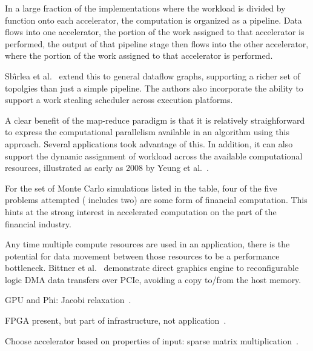 In a large fraction of the implementations where the workload is
divided by function onto each accelerator, the computation is 
organized as a pipeline.  Data flows into one accelerator, the portion
of the work assigned to that accelerator is performed, the output
of that pipeline stage then flows into the other accelerator, where
the portion of the work assigned to that accelerator is performed.

Sb\^{\i}rlea et al.~\cite{szb+12} extend this to general dataflow graphs,
supporting a richer set of topolgies than just a simple pipeline.  The authors
also incorporate the ability to support a work stealing scheduler across
execution platforms.

A clear benefit of the map-reduce paradigm is that it is relatively
straighforward to express the computational parallelism available in
an algorithm using this approach.  Several applications took advantage
of this.  In addition, it can also support the dynamic assignment of
workload across the available computational resources, illustrated as
early as 2008 by Yeung et al.~\cite{ytt+08}.

For the set of Monte Carlo simulations listed in the table,
four of the five problems attempted
(\cite{tttl10} includes two) are some form of financial computation.
This hints at the strong interest in accelerated computation on the
part of the financial industry.

Any time multiple compute resources are used in an application, there is
the potential for data movement between those resources to be a performance
bottleneck.  Bittner et al.~\cite{brf14} demonstrate direct graphics engine
to reconfigurable logic DMA data transfers over PCIe, avoiding a copy
to/from the host memory.

GPU and Phi:
Jacobi relaxation~\cite{cv16}.


FPGA present, but part of infrastructure, not application~\cite{abb+13}.

Choose accelerator based on properties of input:
sparse matrix multiplication~\cite{gsbh16}. 


